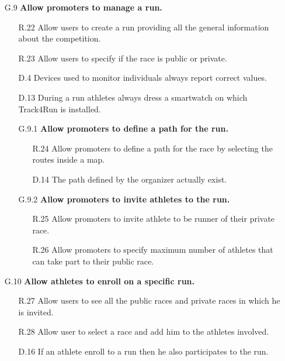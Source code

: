 \begin{enumerate}
\begin{enumerate}
	\item [G.9] \textbf{Allow promoters to manage a run.}
		\begin{enumerate}
		\item [R.22] Allow users to create a run providing all the general information about the competition.
		\item [R.23] Allow users to specify if the race is public or private.
		\item [D.4] Devices used to monitor individuals always report correct values.
		\item [D.13] During a run athletes always dress a smartwatch on which Track4Run is installed.
			
		\item [G.9.1] \textbf{Allow promoters to define a path for the run.}
			\begin{enumerate}
			\item [R.24] Allow promoters to define a path for the race by selecting the routes inside a map.
			\item [D.14] The path defined by the organizer actually exist.
			\end{enumerate}
			
		\item [G.9.2] \textbf{Allow promoters to invite athletes to the run.}
			\begin{enumerate}
			\item [R.25] Allow promoters to invite athlete to be runner of their private race.
			\item [R.26] Allow promoters to specify maximum number of athletes that can take part to their public race.
			\end{enumerate}
	\end{enumerate}
	
	\item [G.10] \textbf{Allow athletes to enroll on a specific run.}
		\begin{enumerate}
		\item [R.27] Allow users to see all the public races and private races in which he is invited.
		\item [R.28] Allow user to select a race and add him to the athletes involved.
		\item [D.16] If an athlete enroll to a run then he also participates to the run.
		\end{enumerate}
	

\end{enumerate}
\end{enumerate}

